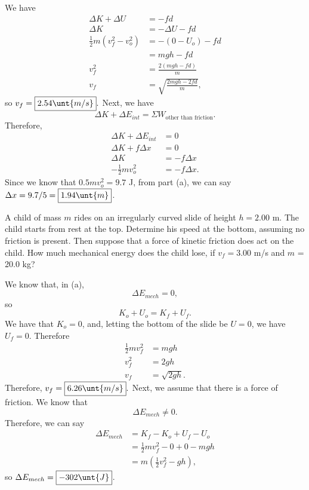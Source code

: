 \documentclass[11pt]{article}
\begin{document}
\begin{solution}
	We have
	\begin{align*}
		\Delta K + \Delta U &= -fd \\
		\Delta K &= -\Delta U - fd \\
		\frac{1}{2}m(v_f^2 - v_o^2) &= -(0 - U_o) - fd \\
		&= mgh - fd \\
		v_f^2 &= \frac{2(mgh-fd)}{m} \\
		v_f &= \sqrt{\frac{2mgh-2fd}{m}},
	\end{align*}
	so $v_f = \boxed{2.54 \unt{m/s}}.$ Next, we have
	\[\Delta K + \Delta E_{int} = \Sigma W_{\text{other than friction}}.\]
	Therefore,
	\begin{align*}
		\Delta K + \Delta E_{int} &= 0 \\
		\Delta K + f\Delta x &= 0 \\
		\Delta K &= -f\Delta x \\
		-\frac{1}{2}mv_o^2 &= -f\Delta x.
	\end{align*}
	Since we know that $0.5mv_o^2 = 9.7$ J, from part (a), we can say $\Delta x = 9.7/5 = \boxed{1.94\unt{m}}$.
\end{solution}

\begin{example}
	A child of mass $m$ rides on an irregularly curved slide of height $h = 2.00$ m. The child starts from rest at the top. Determine his speed at the bottom, assuming no friction is present. Then suppose that a force of kinetic friction does act on the child. How much mechanical energy does the child lose, if $v_f = 3.00$ m/s and $m$ = 20.0 kg?
\end{example}
\begin{solution}
	We know that, in (a),
	\[\Delta E_{mech} = 0,\]
	so
	\[K_o + U_o = K_f + U_f.\]
	We have that $K_o = 0$, and, letting the bottom of the slide be $U = 0$, we have $U_f = 0$. Therefore
	\begin{align*}
		\frac{1}{2}mv_f^2 &= mgh \\
		v_f^2 &= 2gh \\
		v_f &= \sqrt{2gh}.
	\end{align*}
	Therefore, $v_f = \boxed{6.26\unt{m/s}}.$ Next, we assume that there is a force of friction. We know that
	\[\Delta E_{mech} \neq 0.\]
	Therefore, we can say
	\begin{align*}
		\Delta E_{mech} &= K_f - K_o + U_f - U_o \\
		&= \frac{1}{2}mv_f^2 - 0 + 0 - mgh \\
		&= m\left(\frac{1}{2}v_f^2 - gh\right),
	\end{align*}
	so $\Delta E_{mech} = \boxed{-302\unt{J}}$.
\end{solution}
\end{document}
